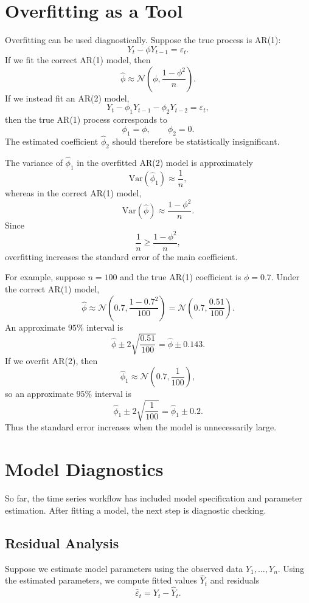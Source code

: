 \documentclass[12pt,oneside]{book}
\numberwithin{equation}{section}
\theoremstyle{definition}
\theoremstyle{plain}
\theoremstyle{remark}
\newcommand{\Var}{\mathrm{Var}}
\newcommand{\Normal}{\mathcal{N}}
\begin{document}
\section{Overfitting as a Tool}

Overfitting can be used diagnostically. Suppose the true process is AR(1):
\[
Y_t-\phi Y_{t-1}=\varepsilon_t.
\]
If we fit the correct AR(1) model, then
\[
\widehat{\phi}
\approx
\Normal\left(
\phi,
\frac{1-\phi^2}{n}
\right).
\]
If we instead fit an AR(2) model,
\[
Y_t-\phi_1Y_{t-1}-\phi_2Y_{t-2}=\varepsilon_t,
\]
then the true AR(1) process corresponds to
\[
\phi_1=\phi,
\qquad
\phi_2=0.
\]
The estimated coefficient $\widehat{\phi}_2$ should therefore be statistically insignificant.

The variance of $\widehat{\phi}_1$ in the overfitted AR(2) model is approximately
\[
\Var(\widehat{\phi}_1)
\approx
\frac{1}{n},
\]
whereas in the correct AR(1) model,
\[
\Var(\widehat{\phi})
\approx
\frac{1-\phi^2}{n}.
\]
Since
\[
\frac{1}{n}
\geq
\frac{1-\phi^2}{n},
\]
overfitting increases the standard error of the main coefficient.

For example, suppose $n=100$ and the true AR(1) coefficient is $\phi=0.7$. Under the correct AR(1) model,
\[
\widehat{\phi}
\approx
\Normal\left(0.7,\frac{1-0.7^2}{100}\right)
=
\Normal\left(0.7,\frac{0.51}{100}\right).
\]
An approximate $95\%$ interval is
\[
\widehat{\phi}\pm 2\sqrt{\frac{0.51}{100}}
=
\widehat{\phi}\pm 0.143.
\]
If we overfit AR(2), then
\[
\widehat{\phi}_1
\approx
\Normal\left(0.7,\frac{1}{100}\right),
\]
so an approximate $95\%$ interval is
\[
\widehat{\phi}_1\pm 2\sqrt{\frac{1}{100}}
=
\widehat{\phi}_1\pm 0.2.
\]
Thus the standard error increases when the model is unnecessarily large.

\section{Model Diagnostics}

So far, the time series workflow has included model specification and parameter estimation. After fitting a model, the next step is diagnostic checking.

\subsection{Residual Analysis}

Suppose we estimate model parameters using the observed data $Y_1,\ldots,Y_n$. Using the estimated parameters, we compute fitted values $\widehat{Y}_t$ and residuals
\[
\widehat{\varepsilon}_t
=
Y_t-\widehat{Y}_t.
\]
\end{document}
